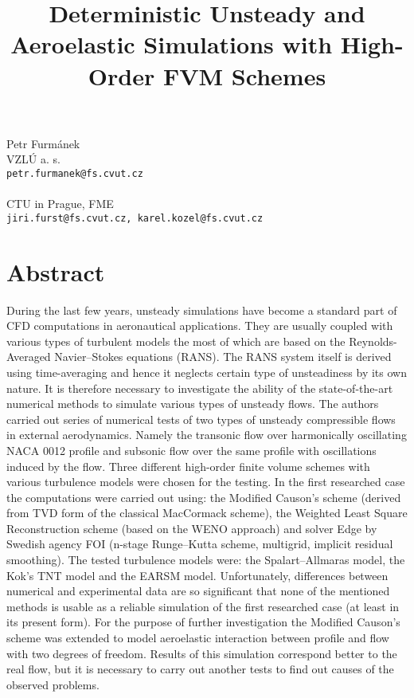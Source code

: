 \title{Deterministic Unsteady and Aeroelastic Simulations with High-Order FVM Schemes}
 \author{} \institute{}
\maketitle
\begin{center}
{\large Petr Furm{\' a}nek}\\
VZL{\' U} a. s. \\
{\tt petr.furmanek@fs.cvut.cz}
\\ \\
CTU in Prague, FME\\
{\tt jiri.furst@fs.cvut.cz,  karel.kozel@fs.cvut.cz}

\end{center}

\section*{Abstract}

During the last few years, unsteady simulations have become a standard part of CFD computations in aeronautical applications. They are usually coupled with various types of turbulent models the most of which are based on the Reynolds-Averaged Navier--Stokes equations (RANS). The RANS system itself is derived using time-averaging and hence it neglects certain type of unsteadiness by its own nature. It is therefore necessary to investigate the ability of the state-of-the-art numerical methods to simulate various types of unsteady flows. The authors carried out series of numerical tests of two types of unsteady compressible flows in external aerodynamics. Namely the transonic flow over harmonically oscillating NACA 0012 profile and subsonic flow over the same profile with oscillations induced by the flow. Three different high-order finite volume schemes with various turbulence models were chosen for the testing. In the first researched case the computations were carried out using: the Modified Causon's scheme \cite{furst-furmanek} (derived from TVD form of the classical MacCormack scheme), the Weighted Least Square Reconstruction scheme  \cite{furst-wlsqr} (based on the WENO approach) and solver Edge by Swedish agency FOI (n-stage Runge--Kutta scheme, multigrid, implicit residual smoothing). The tested turbulence models were: the Spalart--Allmaras model, the Kok's TNT model and the EARSM model. Unfortunately, differences between numerical and experimental data are so significant that none of the mentioned methods is usable as a reliable simulation of the first researched case (at least in its present form). For the purpose of further investigation the Modified Causon's scheme was extended to model aeroelastic interaction between profile and flow with two degrees of freedom. Results of this simulation correspond better to the real flow, but it is necessary to carry out another tests to find out causes of the observed problems.


